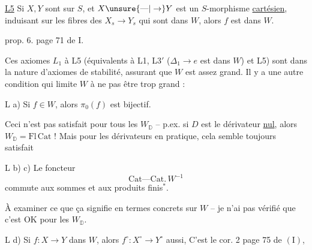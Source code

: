 
\uline{L5} Si $X,Y$ sont  sur $S$, et $X\unsure{\text{---}|\to}Y$ est
un $S$-morphisme \uline{cartésien}, induisant sur les
fibres des $X_s\longrightarrow Y_s$ qui sont dans $W$, alors
$f$ est dans $W$.

  prop. 6. page 71 de $\mathrm I$.

Ces axiomes $L_1$ à L5 (équivalents à
L1, L3$'$ ($\mathbb{\Delta}_1\to e$ est dans $W$) et L5) sont dans
la nature d'axiomes de stabilité, assurant
que $W$ est assez grand. Il y a une autre
condition qui limite $W$ à ne pas être trop
grand :

L a) Si $f\in W$, alors $\pi_0(f)$ est bijectif.

Ceci n'est pas satisfait pour tous les $W_{\mathbb D}$
– p.ex. si $D$ est le dérivateur \uline{nul}, alors 
$W_{\mathbb D}=\mathrm{Fl}\,\mathrm{Cat}$ ! Mais pour les dérivateurs 
en pratique, cela semble toujours satisfait

L b) c) Le foncteur
\[
\mathrm{Cat}\text{---}\mathrm{Cat}.\,W^{-1}
\]
commute aux sommes  et aux produits finis$^{*}$.


À examiner ce que ça signifie en termes
concrets sur $W$ – je n'ai pas vérifié que
c'est OK pour les $W_{\mathbb D}$.

L d) Si $f:X\to Y$ dans $W$, alors $f^\circ:X^\circ\longrightarrow Y^\circ$ aussi,
C'est le cor. 2 page 75 de $(\mathrm I)$,

